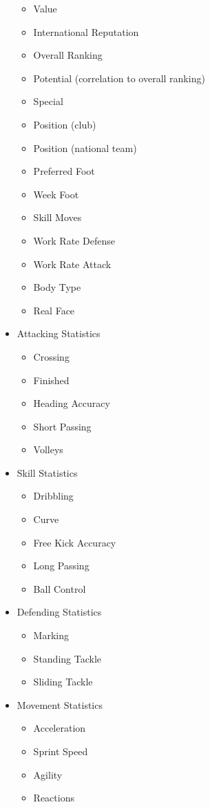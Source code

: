 \begin{multicols}{3}
\begin{itemize}
\begin{itemize}
\item	Value 
\item	International Reputation
\item	Overall Ranking
\item	Potential (correlation to overall ranking)
\item	Special 
\item	Position (club)
\item	Position (national team)
\item	Preferred Foot
\item	Week Foot
\item	Skill Moves
\item	Work Rate Defense
\item	Work Rate Attack 
\item	Body Type 
\item	Real Face 
\end{itemize}
\item	Attacking Statistics
\begin{itemize}
\item	Crossing
\item	Finished
\item	Heading Accuracy
\item	Short Passing
\item	Volleys
\end{itemize}
\columnbreak
\item	Skill Statistics
\begin{itemize}
\item	Dribbling
\item	Curve
\item	Free Kick Accuracy
\item	Long Passing
\item	Ball Control
\end{itemize}
\item	Defending Statistics
\begin{itemize}
\item	Marking
\item	Standing Tackle
\item	Sliding Tackle
\end{itemize}
\item	Movement Statistics
\begin{itemize}
\item	Acceleration
\item	Sprint Speed
\item	Agility
\item	Reactions

\end{itemize}
\end{itemize}
\end{multicols}
